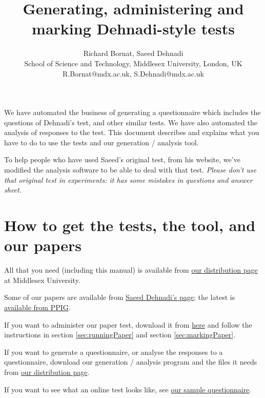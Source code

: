 \documentclass[11pt,a4paper]{article}
\title{Generating, administering and marking Dehnadi-style tests}
\author{Richard Bornat, Saeed Dehnadi \\ School of Science and Technology, Middlesex University, London, UK \\R.Bornat@mdx.ac.uk, S.Dehnadi@mdx.ac.uk}
\newcommand{\secref}[1]{section \ref{sec:#1}}
\begin{document}
\maketitle

%

We have automated the business of generating a questionnaire which includes the questions of Dehnadi's test, and other similar tests. We have also automated the analysis of responses to the test. This document describes and explains what you have to do to use the tests and our generation / analysis tool.

To help people who have used Saeed's original test, from his website, we've modified the analysis software to be able to deal with that test. \emph{Please don't use that original test in experiments: it has some mistakes in questions and answer sheet.}

\newpage
\tableofcontents
\newpage

\section{How to get the tests, the tool, and our papers}

All that you need (including this manual) is available from \href{http://www.eis.mdx.ac.uk/staffpages/r_bornat/tests/distribution.html}{our distribution page} at Middlesex University. 

Some of our papers are available from \href{http://www.eis.mdx.ac.uk/research/PhDArea/saeed/}{Saeed Dehnadi's page}; the latest is \href{http://www.ppig.org/papers/24/8.Observing_mental_models-Richard\%20Bornat.pdf}{available from PPIG}.

If you want to administer our paper test, download it from \href{http://www.eis.mdx.ac.uk/staffpages/r_bornat/tests/distribution.html#papertest}{here} and follow the instructions in \secref{runningPaper} and \secref{markingPaper}. 

If you want to generate a questionnaire, or analyse the responses to a questionnaire, download our generation / analysis program and the files it needs from \href{http://www.eis.mdx.ac.uk/staffpages/r_bornat/tests/distribution.html}{our distribution page}.

If you want to see what an online test looks like, see \href{http://www.eis.mdx.ac.uk/research/mmlp/limesurvey/index.php/survey/index/sid/469385/newtest/Y/lang/en}{our sample questionnaire}. 
\end{document}

